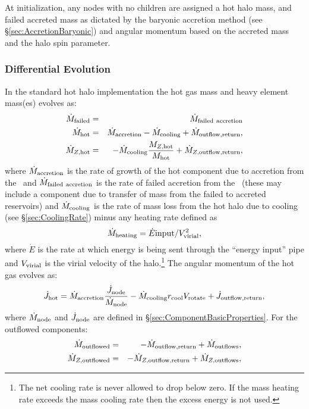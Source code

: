 At initialization, any nodes with no children are assigned a hot halo mass, and failed accreted mass as dictated by the baryonic accretion method (see \S\ref{sec:AccretionBaryonic}) and angular momentum based on the accreted mass and the halo spin parameter.

\subsubsection{Differential Evolution}

In the standard hot halo implementation the hot gas mass and heavy element mass(es) evolves as:
\begin{eqnarray}
 \dot{M}_{\rm failed} &=& \dot{M}_{\rm failed~accretion} \\
 \dot{M}_{\rm hot} &=& \dot{M}_{\rm accretion} - \dot{M}_{\rm cooling} + \dot{M}_{\rm outflow,return}, \\
 \dot{M}_{Z, {\rm hot}} &=& - \dot{M}_{\rm cooling} {M_{Z, {\rm hot}}\over M_{\rm hot}} + \dot{M}_{Z, {\rm outflow,return}}, \\
\end{eqnarray}
where $\dot{M}_{\rm accretion}$ is the rate of growth of the hot component due to accretion from the \IGM\ and $\dot{M}_{\rm failed~accretion}$ is the rate of failed accretion from the \IGM\ (these may include a component due to transfer of mass from the failed to accreted reservoirs) and $\dot{M}_{\rm cooling}$ is the rate of mass loss from the hot halo due to cooling (see \S\ref{sec:CoolingRate}) minus any heating rate defined as
\begin{equation}
 \dot{M}_{\rm heating} = \dot{E}{\rm input} / V_{\rm virial}^2,
\end{equation}
where $\dot{E}$ is the rate at which energy is being sent through the ``energy input'' pipe and $V_{\rm virial}$ is the virial velocity of the halo.\footnote{The net cooling rate is never allowed to drop below zero. If the mass heating rate exceeds the mass cooling rate then the excess energy is not used.} The angular momentum of the hot gas evolves as:
\begin{equation}
 \dot{J}_{\rm hot} = \dot{M}_{\rm accretion} {\dot{J}_{\rm node} \over \dot{M}_{\rm node}} - \dot{M}_{\rm cooling} r_{\rm cool} V_{\rm rotate} + \dot{J}_{\rm outflow,return},
\end{equation}
where $\dot{M}_{\rm node}$ and $\dot{J}_{\rm node}$ are defined in \S\ref{sec:ComponentBasicProperties}. For the outflowed components:
\begin{eqnarray}
 \dot{M}_{\rm outflowed} &=& - \dot{M}_{\rm outflow,return} + \dot{M}_{\rm outflows}, \\
 \dot{M}_{Z, {\rm outflowed}} &=& - \dot{M}_{Z, {\rm outflow,return}} + \dot{M}_{Z, {\rm outflows}}, \\
\end{eqnarray}
